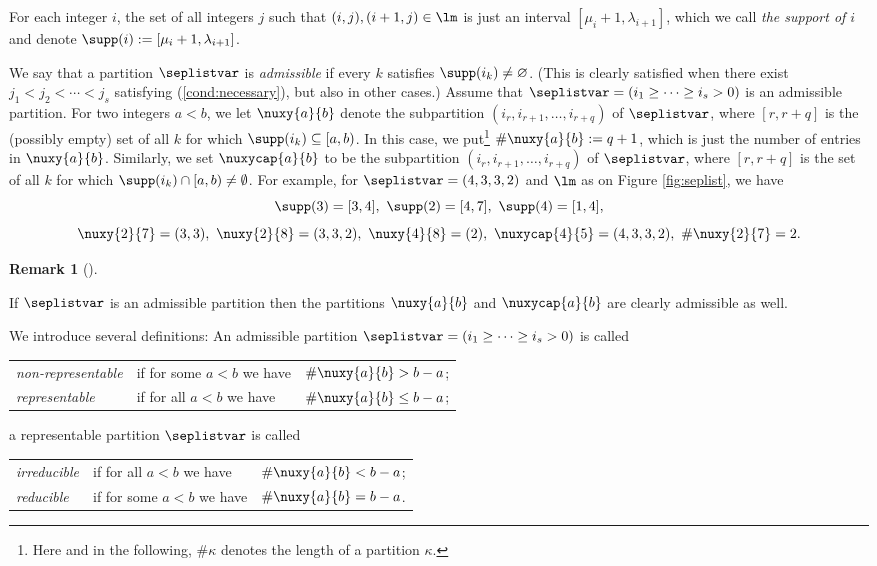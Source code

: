 \documentclass[numbers=enddot,12pt,final,onecolumn,notitlepage]{scrartcl}%
\theoremstyle{definition}
\newtheorem{remk}[theo]{Remark}
\newenvironment{remark}[1][]
{\begin{remk}[#1]\begin{leftbar}}
{\end{leftbar}\end{remk}}
\begin{document}
\def\nuab{\nuxy{a}{b}}
\def\nuabcap{\nuxycap{a}{b}}



For each integer $i$, the set of all integers $j$ such that $(i,j),(i+1,j)\in\lm$ is just an interval $[\mu_{i}+1,\lambda_{i+1}]$, which we call \textit{the support of $i$} and denote $\supp(i):=[\mu_{i}+1,\lambda_{i+1}]$.

We say that a partition $\seplistvar$ is \textit{admissible} if
every $k$ satisfies $\supp(i_k) \neq \varnothing$. (This is
clearly satisfied when there exist $j_1<j_2<\cdots<j_s$
satisfying (\ref{cond:necessary}), but also in other cases.)
Assume that $\seplistvar = \left(i_1 \geq \cdots \geq i_s > 0\right)$ is an admissible partition.
For two integers $a< b$, we let $\nuab$ denote the subpartition $(i_r,i_{r+1},\dots,i_{r+q})$ of $\seplistvar$, where $[r, r+q]$ is the (possibly empty) set of all $k$ for which $\supp(i_k)\subseteq [a,b)$. In this case, we put\footnote{Here and in the following, $\#\kappa$ denotes the length of a partition $\kappa$.} $\#\nuab:=q+1$, which is just the number of entries in $\nuab$. Similarly, we set $\nuabcap$ to be the subpartition $(i_r,i_{r+1},\dots,i_{r+q})$ of $\seplistvar$, where $[r, r+q]$ is the set of all $k$ for which $\supp(i_k)\cap [a,b)\neq\emptyset$.
For example, for $\seplistvar=(4,3,3,2)$ and $\lm$ as on Figure \ref{fig:seplist}, we have 
$$\supp(3)=[3,4],\ \supp(2)=[4,7],\ \supp(4)=[1,4],$$ 
$$\nuxy{2}{7}=(3,3),\ \nuxy{2}{8}=(3,3,2),\ \nuxy{4}{8}=(2),\ \nuxycap{4}{5}=(4,3,3,2),\ \#\nuxy{2}{7}=2.$$

\begin{remark}
 If $\seplistvar$ is an admissible partition then the partitions $\nuab$ and $\nuabcap$ are clearly admissible as well. 
\end{remark}


We introduce several definitions: An admissible partition $\seplistvar=(i_1\geq \cdots\geq i_s>0)$ is called

\begin{tabular}{@{$\bullet$ }lll}
 \textit{non-representable} & if for some $a<b$ we have & $\#\nuab>b-a$;\\
 \textit{representable}& if for all $a<b$ we have& $\#\nuab\leq b-a$;\\
\end{tabular}

a representable partition $\seplistvar$ is called

\begin{tabular}{@{$\bullet$ }lll} 
 \textit{irreducible}& if for all  $a<b$ we have &$\#\nuab < b-a$;\\
 \textit{reducible} &if for some $a<b$ we have &$\#\nuab=b-a$.
\end{tabular}
\end{document}

